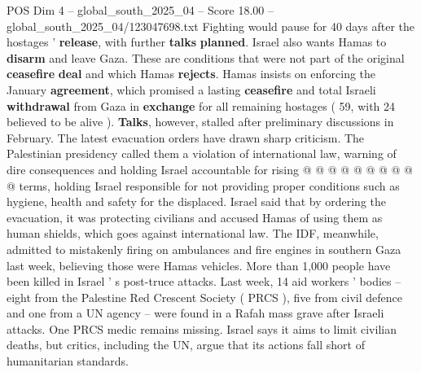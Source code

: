 \begin{textsample}{POS Dim 4 – global\_south\_2025\_04 – Score 18.00 – global\_south\_2025\_04/123047698.txt}
Fighting would pause for 40 days after the hostages ' \textbf{release}, with further \textbf{talks} \textbf{planned}.
Israel also wants Hamas to \textbf{disarm} and leave Gaza.
These are conditions that were not part of the original \textbf{ceasefire} \textbf{deal} and which Hamas \textbf{rejects}.
Hamas insists on enforcing the January \textbf{agreement}, which promised a lasting \textbf{ceasefire} and total Israeli \textbf{withdrawal} from Gaza in \textbf{exchange} for all remaining hostages ( 59, with 24 believed to be alive ). \textbf{Talks}, however, stalled after preliminary discussions in February.
The latest evacuation orders have drawn sharp criticism.
The Palestinian presidency called them a violation of international law, warning of dire consequences and holding Israel accountable for rising @ @ @ @ @ @ @ @ @ @ terms, holding Israel responsible for not providing proper conditions such as hygiene, health and safety for the displaced.
Israel said that by ordering the evacuation, it was protecting civilians and accused Hamas of using them as human shields, which goes against international law.
The IDF, meanwhile, admitted to mistakenly firing on ambulances and fire engines in southern Gaza last week, believing those were Hamas vehicles.
More than 1,000 people have been killed in Israel ' s post-truce attacks.
Last week, 14 aid workers ' bodies -- eight from the Palestine Red Crescent Society ( PRCS ), five from civil defence and one from a UN agency -- were found in a Rafah mass grave after Israeli attacks.
One PRCS medic remains missing.
Israel says it aims to limit civilian deaths, but critics, including the UN, argue that its actions fall short of humanitarian standards.

\end{textsample}
